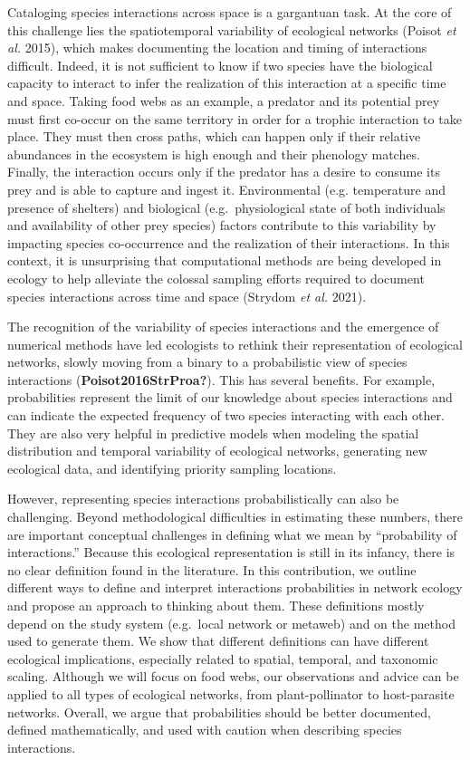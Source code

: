 \documentclass[10pt,oneside]{article}
\begin{document}
Cataloging species interactions across space is a gargantuan task. At
the core of this challenge lies the spatiotemporal variability of
ecological networks (Poisot \emph{et al.} 2015), which makes documenting
the location and timing of interactions difficult. Indeed, it is not
sufficient to know if two species have the biological capacity to
interact to infer the realization of this interaction at a specific time
and space. Taking food webs as an example, a predator and its potential
prey must first co-occur on the same territory in order for a trophic
interaction to take place. They must then cross paths, which can happen
only if their relative abundances in the ecosystem is high enough and
their phenology matches. Finally, the interaction occurs only if the
predator has a desire to consume its prey and is able to capture and
ingest it. Environmental (e.g. temperature and presence of shelters) and
biological (e.g.~physiological state of both individuals and
availability of other prey species) factors contribute to this
variability by impacting species co-occurrence and the realization of
their interactions. In this context, it is unsurprising that
computational methods are being developed in ecology to help alleviate
the colossal sampling efforts required to document species interactions
across time and space (Strydom \emph{et al.} 2021).

The recognition of the variability of species interactions and the
emergence of numerical methods have led ecologists to rethink their
representation of ecological networks, slowly moving from a binary to a
probabilistic view of species interactions
(\textbf{Poisot2016StrProa?}). This has several benefits. For example,
probabilities represent the limit of our knowledge about species
interactions and can indicate the expected frequency of two species
interacting with each other. They are also very helpful in predictive
models when modeling the spatial distribution and temporal variability
of ecological networks, generating new ecological data, and identifying
priority sampling locations.

However, representing species interactions probabilistically can also be
challenging. Beyond methodological difficulties in estimating these
numbers, there are important conceptual challenges in defining what we
mean by ``probability of interactions.'' Because this ecological
representation is still in its infancy, there is no clear definition
found in the literature. In this contribution, we outline different ways
to define and interpret interactions probabilities in network ecology
and propose an approach to thinking about them. These definitions mostly
depend on the study system (e.g.~local network or metaweb) and on the
method used to generate them. We show that different definitions can
have different ecological implications, especially related to spatial,
temporal, and taxonomic scaling. Although we will focus on food webs,
our observations and advice can be applied to all types of ecological
networks, from plant-pollinator to host-parasite networks. Overall, we
argue that probabilities should be better documented, defined
mathematically, and used with caution when describing species
interactions.
\end{document}

